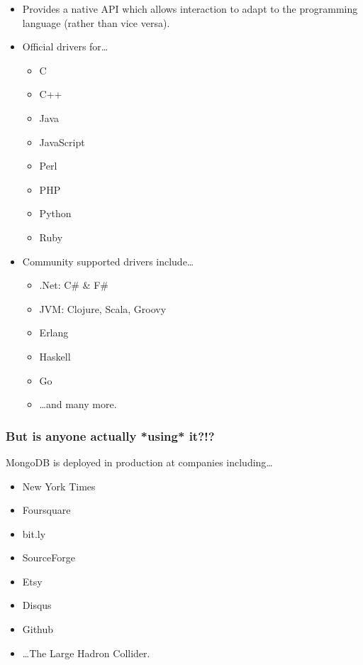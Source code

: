\documentclass{beamer}
\newenvironment{itemizeframe}
               {\begin{frame}\startitemizeframe} 
               {\stopitemizeframe\end{frame}}
\newcommand\startitemizeframe{\begin{itemize}} \newcommand\stopitemizeframe{\end{itemize}}
\begin{document}
\begin{itemizeframe}
\frametitle{Programming with MongoDB}
\item Provides a native API which allows interaction to adapt to the programming language (rather than vice versa).
\item<2-> Official drivers for\ldots
    \begin{itemize}
        \item<2-> C
        \item<2-> C++
        \item<2-> Java
        \item<2-> JavaScript
        \item<2-> Perl
        \item<2-> PHP
        \item<2-> Python
        \item<2-> Ruby
    \end{itemize}
\item<3-> Community supported drivers include\ldots
    \begin{itemize}
        \item<3-> .Net: C\# \& F\#
        \item<3-> JVM: Clojure, Scala, Groovy
        \item<3-> Erlang
        \item<3-> Haskell
        \item<3-> Go 
        \item<3-> \ldots and many more.
    \end{itemize}
\end{itemizeframe}
\begin{frame}
\frametitle{But is anyone actually *using* it?!?}
    MongoDB is deployed in production at companies including\ldots
    \begin{itemize}
        \item New York Times 
        \item Foursquare 
        \item bit.ly 
        \item SourceForge
        \item Etsy 
        \item Disqus
        \item Github\pause
        \item \ldots The Large Hadron Collider.  
    \end{itemize}
\end{frame}
\end{document}
